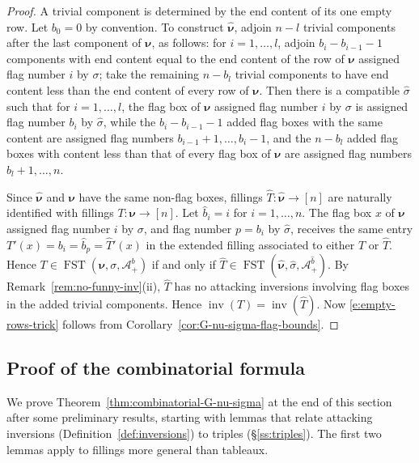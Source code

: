 \documentclass[12pt]{amsart}
\theoremstyle{definition}
\theoremstyle{remark}
\newcommand{\nubold}{{\boldsymbol \nu }}
\newcommand{\Acal}{{\mathcal A}}
\newcommand{\That}{\widehat{T}}
\newcommand{\bhat}{\widehat{b}}
\newcommand{\sigmahat}{\widehat{\sigma }}
\newcommand{\nuboldhat}{\widehat{\nubold }}
\DeclareMathOperator{\inv}{inv}
\DeclareMathOperator{\FSST}{FST}
\begin{document}
\begin{proof}
A trivial component is determined by the end content of its one empty
row.  Let $b_{0} = 0$ by convention.  To construct $\nuboldhat $,
adjoin $n-l$ trivial components after the last component of $\nubold
$, as follows: for $i=1,\ldots,l$, adjoin $b_{i}- b_{i-1} -1$
components with end content equal to the end content of the row of
$\nubold $ assigned flag number $i$ by $\sigma $; take the remaining
$n-b_{l}$ trivial components to have end content less than the end
content of every row of $\nubold $.  Then there is a compatible
$\sigmahat $ such that for $i=1,\ldots,l$, the flag box of $\nubold $
assigned flag number $i$ by $\sigma $ is assigned flag number $b_{i}$
by $\sigmahat $, while the $b_{i}-b_{i-1}-1$ added flag boxes with the
same content are assigned flag numbers $b_{i-1}+1, \ldots, b_{i}-1$,
and the $n- b_{l}$ added flag boxes with content less than that of
every flag box of $\nubold $ are assigned flag numbers
$b_{l}+1,\ldots, n$.

Since $\nuboldhat $ and $\nubold $ have the same non-flag boxes,
fillings $\That :\nuboldhat \rightarrow [n]$ are naturally identified
with fillings $T: \nubold\rightarrow [n]$.  Let $\bhat _{i} = i$ for
$i=1,\ldots,n$.  The flag box $x$ of $\nubold $ assigned flag number
$i$ by $\sigma $, and flag number $p = b_{i}$ by $\sigmahat $,
receives the same entry $T'(x) = b_{i} = \bhat _{p} = \That '(x)$ in
the extended filling associated to either $T$ or $\That $.  Hence
$T\in \FSST (\nubold ,\sigma ,\Acal ^{b}_{+})$ if and only if $\That \in
\FSST (\nuboldhat ,\sigmahat ,\Acal ^{\bhat }_{+})$.  By
Remark~\ref{rem:no-funny-inv}(ii), $\That $ has no attacking
inversions involving flag boxes in the added trivial components.
Hence $\inv (T) = \inv (\That )$.  Now \eqref{e:empty-rows-trick}
follows from Corollary~\ref{cor:G-nu-sigma-flag-bounds}.
\end{proof}



\subsection{Proof of the combinatorial formula}
\label{ss:proof}

We prove Theorem~\ref{thm:combinatorial-G-nu-sigma} at the end of this
section after some preliminary results, starting with lemmas that
relate attacking inversions (Definition~\ref{def:inversions}) to
triples (\S\ref{ss:triples}).  The first two lemmas apply to fillings
more general than tableaux.
\end{document}
